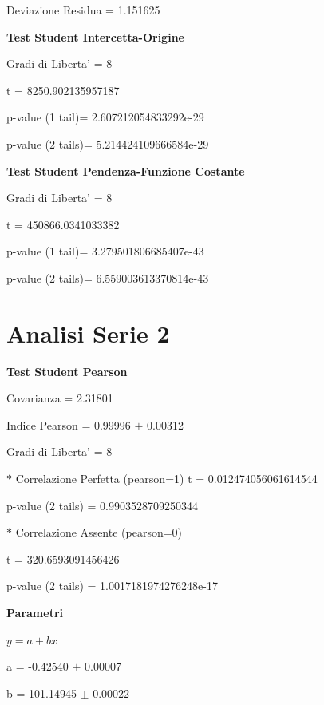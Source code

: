 \documentclass{article}
\begin{document}
Deviazione Residua = 1.151625

\textbf{Test Student Intercetta-Origine}

Gradi di Liberta' = 8

t = 8250.902135957187

p-value (1 tail)= 2.607212054833292e-29

p-value (2 tails)= 5.214424109666584e-29

\textbf{Test Student Pendenza-Funzione Costante}

Gradi di Liberta' = 8

t = 450866.0341033382

p-value (1 tail)= 3.279501806685407e-43

p-value (2 tails)= 6.559003613370814e-43

\section*{Analisi Serie 2}

\textbf{Test Student Pearson}

Covarianza = 2.31801

Indice Pearson = 0.99996 $\pm$ 0.00312

Gradi di Liberta' = 8

$\ast$ Correlazione Perfetta (pearson=1)
t = 0.012474056061614544

p-value (2 tails) = 0.9903528709250344

$\ast$ Correlazione Assente (pearson=0)

t = 320.6593091456426

p-value (2 tails) = 1.0017181974276248e-17

\textbf{Parametri}

$y = a + bx$

a = -0.42540 $\pm$ 0.00007

b = 101.14945 $\pm$ 0.00022
\end{document}
